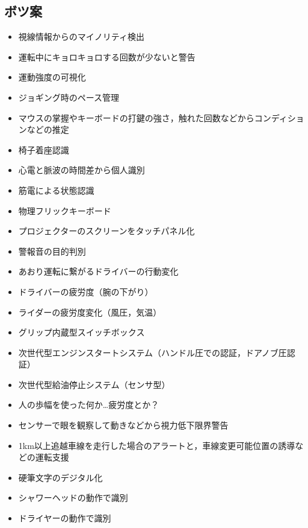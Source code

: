 \documentclass[a4j,10pt]{jarticle}
\begin{document}
\begin{multicols}{2}
  \section{ボツ案}
  \begin{itemize}
    \item 視線情報からのマイノリティ検出
    \item 運転中にキョロキョロする回数が少ないと警告
    \item 運動強度の可視化
    \item ジョギング時のペース管理
    \item マウスの掌握やキーボードの打鍵の強さ，触れた回数などからコンディションなどの推定
    \item 椅子着座認識
    \item 心電と脈波の時間差から個人識別
    \item 筋電による状態認識
    \item 物理フリックキーボード
    \item プロジェクターのスクリーンをタッチパネル化
    \item 警報音の目的判別
    \item あおり運転に繋がるドライバーの行動変化
    \item ドライバーの疲労度（腕の下がり）
    \item ライダーの疲労度変化（風圧，気温）
    \item グリップ内蔵型スイッチボックス
    \item 次世代型エンジンスタートシステム（ハンドル圧での認証，ドアノブ圧認証）
    \item 次世代型給油停止システム（センサ型）
    \item 人の歩幅を使った何か…疲労度とか？
    \item センサーで眼を観察して動きなどから視力低下限界警告
    \item 1km以上追越車線を走行した場合のアラートと，車線変更可能位置の誘導などの運転支援
    \item 硬筆文字のデジタル化
    \item シャワーヘッドの動作で識別
    \item ドライヤーの動作で識別
  \end{itemize}
\end{multicols}
\end{document}
